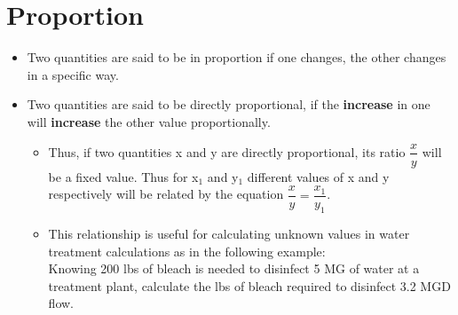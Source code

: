 \section{Proportion}
\begin{itemize}
\item Two quantities are said to be in proportion if one changes, the other changes in a specific way.
\item Two quantities are said to be directly proportional, if the \textbf{increase} in one will \textbf{increase} the other value proportionally.  
\begin{itemize}
\item Thus, if two quantities x and y are directly proportional, its ratio $\dfrac{x}{y}$ will be a fixed value. Thus for x$_1$ and y$_1$ different values of x and y respectively will be related by the equation $\dfrac{x}{y}=\dfrac{x_1}{y_1}$.  

\item This relationship is useful for calculating unknown values in water treatment calculations as in the following example: \\
\vspace{0.2cm}
Knowing 200 lbs of bleach is needed to disinfect 5 MG of water at a treatment plant, calculate the lbs of bleach required to disinfect 3.2 MGD flow.\\

\vspace{0.2cm}


\end{itemize}
\end{itemize}
